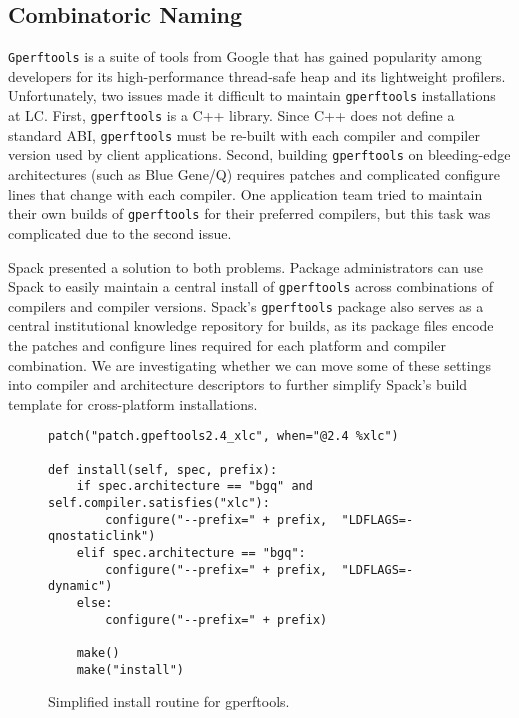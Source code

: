 
\subsection{Combinatoric Naming}
\label{sec:usecase-combinatoric}

{\tt Gperftools} is a suite of tools from Google that has gained popularity among
developers for its high-performance thread-safe heap and its lightweight profilers.
Unfortunately, two issues made it difficult to maintain {\tt gperftools} installations
at LC.  First, {\tt gperftools} is a C++ library.  Since C++ does not define a standard
ABI, {\tt gperftools} must be re-built with each compiler and compiler version used by client
applications.  Second, building {\tt gperftools} on bleeding-edge architectures
(such as Blue Gene/Q) requires patches and complicated configure lines that
change with each compiler.  One application team tried to maintain their own
builds of {\tt gperftools} for their preferred compilers, but this
task was complicated due to the second issue.

Spack presented a solution to both problems.  Package administrators can use Spack to
easily maintain a central install of {\tt gperftools} across combinations of
compilers and compiler versions.  Spack's {\tt gperftools} package also serves as a central
institutional knowledge repository for builds, as its package files encode
the patches and configure lines required for each platform and compiler combination.
We are investigating whether we can move some of these settings into compiler and
architecture descriptors to further simplify Spack's build template for cross-platform
installations.
\begin{figure}
\begin{verbatim}
patch("patch.gpeftools2.4_xlc", when="@2.4 %xlc")

def install(self, spec, prefix):
    if spec.architecture == "bgq" and self.compiler.satisfies("xlc"):
        configure("--prefix=" + prefix,  "LDFLAGS=-qnostaticlink")
    elif spec.architecture == "bgq":
        configure("--prefix=" + prefix,  "LDFLAGS=-dynamic")
    else:
        configure("--prefix=" + prefix)

    make()
    make("install")
\end{verbatim}
  \caption{
    Simplified install routine for gperftools.
    \label{fig:gperftools}
  }
\end{figure}

